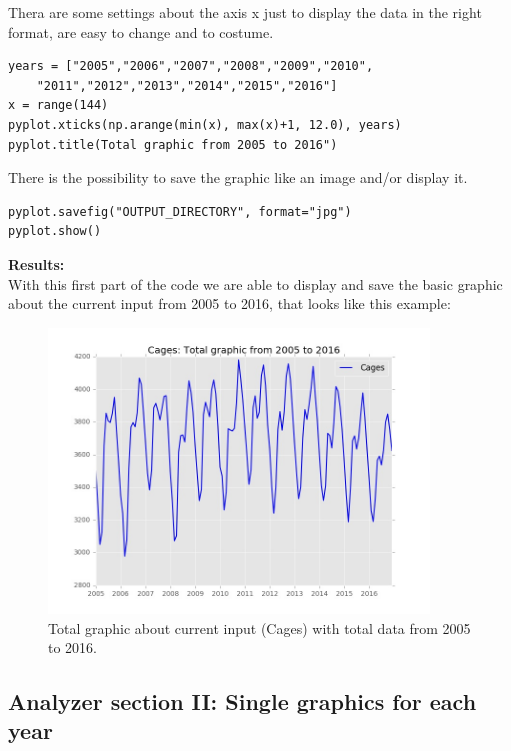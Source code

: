 Thera are some settings about the axis x just to display the data in the right format, are easy to change and to costume.
\begin{lstlisting}
years = ["2005","2006","2007","2008","2009","2010",
	"2011","2012","2013","2014","2015","2016"]
x = range(144)
pyplot.xticks(np.arange(min(x), max(x)+1, 12.0), years)
pyplot.title(Total graphic from 2005 to 2016")
\end{lstlisting}

There is the possibility to save the graphic like an image and/or display it.
\begin{lstlisting}
pyplot.savefig("OUTPUT_DIRECTORY", format="jpg")
pyplot.show()
\end{lstlisting}




\begin{minipage}{0.5\textwidth}
\textbf{Results:} \\
With this first part of the code we are able to display and save the basic graphic about the current input from 2005 to 2016, that looks like this example:
\end{minipage} \hfill
\begin{minipage}{0.45\textwidth}
\begin{figure}[H]
\includegraphics[width=0.9\textwidth]{Files/Cages_Total.jpg}
\caption{Total graphic about current input (Cages) with total data from 2005 to 2016.}
\end{figure}
\end{minipage}


\newpage
\subsection{Analyzer section II: Single graphics for each year}


